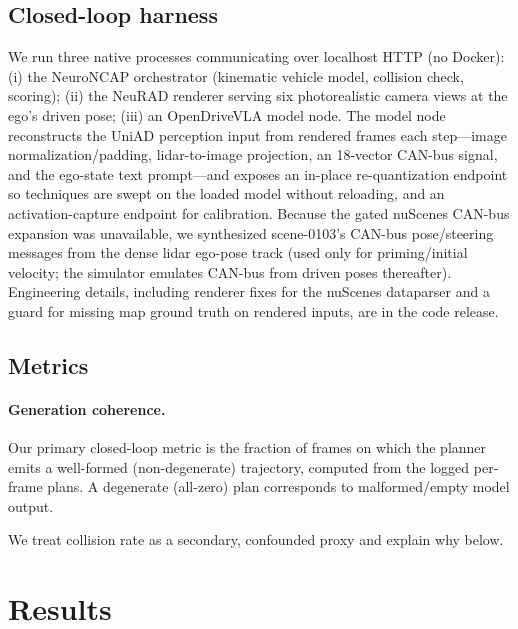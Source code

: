 \documentclass[11pt]{article}
\begin{document}
\subsection{Closed-loop harness}
We run three native processes communicating over localhost HTTP (no Docker): (i) the NeuroNCAP
orchestrator (kinematic vehicle model, collision check, scoring); (ii) the NeuRAD renderer serving
six photorealistic camera views at the ego's driven pose; (iii) an OpenDriveVLA model node. The
model node reconstructs the UniAD perception input from rendered frames each step---image
normalization/padding, lidar-to-image projection, an 18-vector CAN-bus signal, and the ego-state
text prompt---and exposes an in-place re-quantization endpoint so techniques are swept on the loaded
model without reloading, and an activation-capture endpoint for calibration. Because the gated
nuScenes CAN-bus expansion was unavailable, we synthesized scene-0103's CAN-bus pose/steering
messages from the dense lidar ego-pose track (used only for priming/initial velocity; the simulator
emulates CAN-bus from driven poses thereafter). Engineering details, including renderer fixes for
the nuScenes dataparser and a guard for missing map ground truth on rendered inputs, are in the code
release.

\subsection{Metrics}
\paragraph{Generation coherence.} Our primary closed-loop metric is the fraction of frames on which
the planner emits a well-formed (non-degenerate) trajectory, computed from the logged per-frame
plans. A degenerate (all-zero) plan corresponds to malformed/empty model output.

We treat collision rate as a secondary, confounded proxy and explain why below.

\section{Results}
\end{document}
